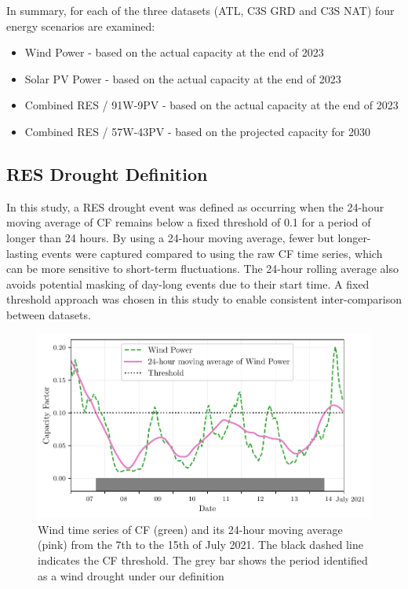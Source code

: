 \documentclass[preprint, 12pt]{elsarticle}
\begin{document}
In summary, for each of the three datasets (ATL, C3S GRD and C3S NAT) four energy scenarios are examined:

\begin{itemize}
	\item Wind Power - based on the actual capacity at the end of 2023
	\item Solar PV Power - based on the actual capacity at the end of 2023
	\item Combined RES / 91W-9PV - based on the actual capacity at the end of 2023
	\item Combined RES / 57W-43PV - based on the projected capacity for 2030
\end{itemize}

\subsection{RES Drought Definition}
\label{sec:res_drought}

In this study, a RES drought event was defined as occurring when the 24-hour moving average of CF remains below a fixed threshold of 0.1 for a period of longer than 24 hours. By using a 24-hour moving average, fewer but longer-lasting events were captured compared to using the raw CF time series, which can be more sensitive to short-term fluctuations. The 24-hour rolling average also avoids potential masking of day-long events due to their start time. A fixed threshold approach was chosen in this study to enable consistent inter-comparison between datasets.

\begin{figure}[ht!]
	\centering
	\includegraphics[width=\textwidth]{droughts_methodology.pdf}
	\caption{Wind time series of CF (green) and its 24-hour moving average (pink) from the 7th to the 15th of July 2021. The black dashed line indicates the CF threshold. The grey bar shows the period identified as a wind drought under our definition}
	\label{fig:find_res_droughts}
\end{figure}
\end{document}
